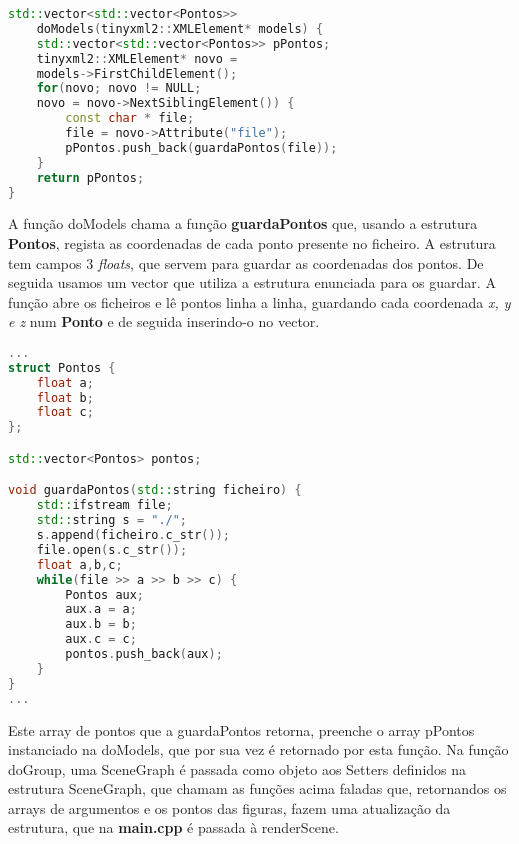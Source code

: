 \documentclass{article}
\begin{document}
\begin{file}
	\begin{lstlisting}[language=C++]
std::vector<std::vector<Pontos>> 
	doModels(tinyxml2::XMLElement* models) {
    std::vector<std::vector<Pontos>> pPontos;
    tinyxml2::XMLElement* novo = 
	models->FirstChildElement();
    for(novo; novo != NULL; 
	novo = novo->NextSiblingElement()) {
        const char * file;
        file = novo->Attribute("file");
        pPontos.push_back(guardaPontos(file));
    }
    return pPontos;
}
	\end{lstlisting}
\end{file}
	
A função doModels chama a função \textbf{guardaPontos} que, usando a estrutura \textbf{Pontos}, regista as coordenadas de cada ponto presente no ficheiro. A estrutura tem campos 3 \textit{floats}, que servem para guardar as coordenadas dos pontos. De seguida usamos um vector que utiliza a estrutura enunciada para os guardar.
A função abre os ficheiros e lê pontos linha a linha, guardando cada coordenada \textit{x, y e z} num \textbf{Ponto} e de seguida inserindo-o no vector.

\begin{file}
	\begin{lstlisting}[language=C++]
...
struct Pontos {
    float a;
    float b;
    float c;
};

std::vector<Pontos> pontos;

void guardaPontos(std::string ficheiro) {
	std::ifstream file;
	std::string s = "./";
	s.append(ficheiro.c_str());
	file.open(s.c_str());
	float a,b,c;
	while(file >> a >> b >> c) {
		Pontos aux;
		aux.a = a;
		aux.b = b;
		aux.c = c;
		pontos.push_back(aux);
	}
}
...
	\end{lstlisting}
\end{file}

Este array de pontos que a guardaPontos retorna, preenche o array pPontos instanciado na doModels, que por sua vez é retornado por esta função. Na função doGroup, uma SceneGraph é passada como objeto aos Setters definidos na estrutura SceneGraph, que chamam as funções acima faladas que, retornandos os arrays de argumentos e os pontos das figuras, fazem uma atualização da estrutura, que na \textbf{main.cpp} é passada à renderScene.
\newpage
\end{document}
